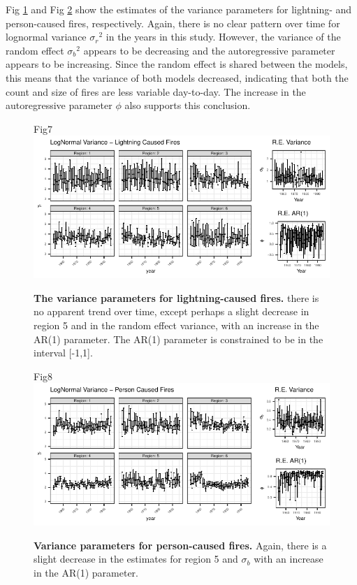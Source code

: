 \documentclass[10pt,letterpaper]{article}
\begin{document}
Fig \ref{sigestl} and Fig \ref{sigestp} show the estimates of the
variance parameters for lightning- and person-caused fires,
respectively. Again, there is no clear pattern over time for lognormal
variance ${\sigma_r}^2$ in the years in this study. However, the variance of the random
effect ${\sigma_b}^2$ appears to be decreasing and the autoregressive parameter appears
to be increasing. Since the random effect is shared between the models,
this means that the variance of both models decreased, indicating that
both the count and size of fires are less variable day-to-day. The
increase in the autoregressive parameter $\phi$ also supports this conclusion.

\begin{figure}[h!]
\centering
Fig7
\includegraphics[width=\textwidth]{Joint_Count_Files/sigestl-1.pdf}
\caption{\label{sigestl}\textbf{The variance parameters for lightning-caused
fires.} there is no apparent trend over time, except perhaps a slight
decrease in region 5 and in the random effect variance, with an increase
in the AR(1) parameter. The AR(1) parameter is constrained to be in the
interval {[}-1,1{]}.}
\end{figure}

\begin{figure}[h!]
\centering
Fig8
\includegraphics[width=\textwidth]{Joint_Count_Files/sigestp-1.pdf}
\caption{\label{sigestp}\textbf{Variance parameters for person-caused fires.}
Again, there is a slight decrease in the estimates for region 5 and
\(\sigma_b\) with an increase in the AR(1) parameter.}
\end{figure}
\end{document}
